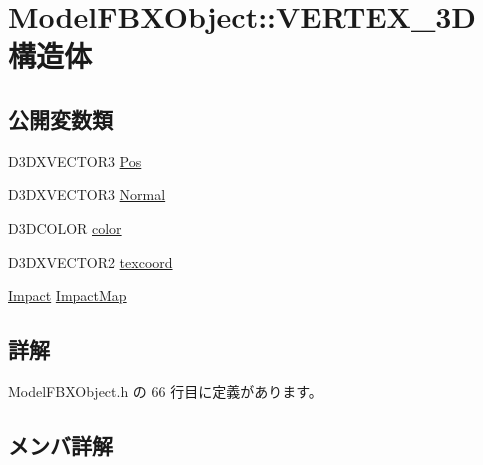 \hypertarget{struct_model_f_b_x_object_1_1_v_e_r_t_e_x__3_d}{}\section{Model\+F\+B\+X\+Object\+:\+:V\+E\+R\+T\+E\+X\+\_\+3D 構造体}
\label{struct_model_f_b_x_object_1_1_v_e_r_t_e_x__3_d}
\subsection*{公開変数類}
\begin{DoxyCompactItemize}
\item 
D3\+D\+X\+V\+E\+C\+T\+O\+R3 \mbox{\hyperlink{struct_model_f_b_x_object_1_1_v_e_r_t_e_x__3_d_a45139f19096594648725cf4ba423a153}{Pos}}
\item 
D3\+D\+X\+V\+E\+C\+T\+O\+R3 \mbox{\hyperlink{struct_model_f_b_x_object_1_1_v_e_r_t_e_x__3_d_abebed506ca81100972b14551cc8604b6}{Normal}}
\item 
D3\+D\+C\+O\+L\+OR \mbox{\hyperlink{struct_model_f_b_x_object_1_1_v_e_r_t_e_x__3_d_acddb3b5872f21abf11027cb19b04a650}{color}}
\item 
D3\+D\+X\+V\+E\+C\+T\+O\+R2 \mbox{\hyperlink{struct_model_f_b_x_object_1_1_v_e_r_t_e_x__3_d_a18087d39d9ff1bfbcc9159b4f98b73b0}{texcoord}}
\item 
\mbox{\hyperlink{struct_model_f_b_x_object_1_1_impact}{Impact}} \mbox{\hyperlink{struct_model_f_b_x_object_1_1_v_e_r_t_e_x__3_d_a188495c5b63503fd6e2ba720dcba7f19}{Impact\+Map}}
\end{DoxyCompactItemize}


\subsection{詳解}


 Model\+F\+B\+X\+Object.\+h の 66 行目に定義があります。



\subsection{メンバ詳解}
\mbox{\label{struct_model_f_b_x_object_1_1_v_e_r_t_e_x__3_d_acddb3b5872f21abf11027cb19b04a650}} 
